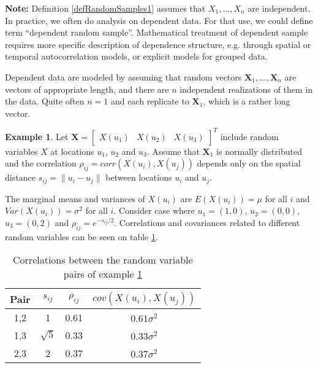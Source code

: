 \documentclass[10pt, twoside, a4paper]{book}
\theoremstyle{definition}
\newtheorem{example}{Example}[chapter]
\begin{document}
\textbf{Note:} Definition \ref{defRandomSamples1} assumes that $X_1,\ldots,X_n$
are independent. In practice, we often do analysis on dependent data. For that
use, we could define term ``dependent random sample''. Mathematical treatment of
dependent sample requires more specific description of dependence structure,
e.g. through spatial or temporal autocorrelation models, or explicit models for
grouped data.

Dependent data are modeled by assuming that random vectors $\bm
X_1,\ldots,\bm X_n$ are vectors of appropriate length, and there are $n$
independent realizations of them in the data. Quite often $n=1$ and each
replicate to $\bm X_1$, which is a rather long vector.
\begin{example} %
\label{exampleSpatialData1}
Let $\bm X = \begin{bmatrix} X(u_1) & X(u_2) & X(u_3) \end{bmatrix}^T$ include
random variables $X$ at locations $u_1$, $u_2$ and $u_3$. Assume that $\bm X_1$
is normally distributed and the correlation $\rho_{ij} = corr(X(u_i), X(u_j))$
depends only on the spatial distance $s_{ij} = \lVert u_i - u_j \rVert$ between
locations $u_i$ and $u_j$.

The marginal means and variances of $X(u_i)$ are $E(X(u_i))=\mu$ for all $i$ and
$Var(X(u_i)) = \sigma^2$ for all $i$. Consider case where $u_1 = (1,0)$, $u_2 =
(0,0)$, $u_3=(0,2)$ and $\rho_{ij} = e^{-s_{ij}/2}$. Correlations and
covariances related to different random variables can be seen on table
\ref{exampleSpatialData1Table1}.

\begin{table}[h]
\caption{Correlations between the random variable pairs
of example \ref{exampleSpatialData1}}
\label{exampleSpatialData1Table1}
\renewcommand{\arraystretch}{1.4}
\renewcommand{\tabcolsep}{0.3cm}
\begin{tabular}{c|c|c|c}
Pair & $s_{ij}$ & $\rho_{ij}$ & $cov(X(u_i), X(u_j))$ \\
\hline
1,2 & 1 & 0.61 & $0.61 \sigma^2$ \\
1,3 & $\sqrt{5}$ & 0.33 & $0.33 \sigma^2$ \\
2,3 & 2 & 0.37 & $0.37 \sigma^2$ \\


\end{tabular}
\end{table}
\end{example}
\end{document}
